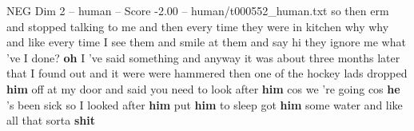 \begin{textsample}{NEG Dim 2 – human – Score -2.00 – human/t000552\_human.txt}  \label{ex:f2_neg_008}
so then erm and stopped talking to me and then every time they were in kitchen why why and like every time I see them and smile at them and say hi they ignore me what 've I done? \textbf{oh} I 've said something and anyway it was about three months later that I found out and it were were hammered then one of the hockey lads dropped \textbf{him} off at my door and said you need to look after \textbf{him} cos we 're going cos \textbf{he} 's been sick so I looked after \textbf{him} put \textbf{him} to sleep got \textbf{him} some water and like all that sorta \textbf{shit}

\end{textsample}
